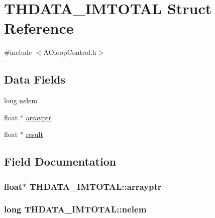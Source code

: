 \hypertarget{structTHDATA__IMTOTAL}{}\section{T\+H\+D\+A\+T\+A\+\_\+\+I\+M\+T\+O\+T\+A\+L Struct Reference}
\label{structTHDATA__IMTOTAL}


{\ttfamily \#include $<$A\+Oloop\+Control.\+h$>$}

\subsection*{Data Fields}
\begin{DoxyCompactItemize}
\item 
long \hyperlink{structTHDATA__IMTOTAL_a76ddea2173c5446db1f3af1494aaf696}{nelem}
\item 
float $\ast$ \hyperlink{structTHDATA__IMTOTAL_ad6cf52b519e71665d6dc23ac14bec80e}{arrayptr}
\item 
float $\ast$ \hyperlink{structTHDATA__IMTOTAL_a9e7c01abf8aad470594aa818ef3335d8}{result}
\end{DoxyCompactItemize}


\subsection{Field Documentation}
\hypertarget{structTHDATA__IMTOTAL_ad6cf52b519e71665d6dc23ac14bec80e}{}
\subsubsection[{arrayptr}]{\setlength{\rightskip}{0pt plus 5cm}float$\ast$ T\+H\+D\+A\+T\+A\+\_\+\+I\+M\+T\+O\+T\+A\+L\+::arrayptr}\label{structTHDATA__IMTOTAL_ad6cf52b519e71665d6dc23ac14bec80e}
\hypertarget{structTHDATA__IMTOTAL_a76ddea2173c5446db1f3af1494aaf696}{}
\subsubsection[{nelem}]{\setlength{\rightskip}{0pt plus 5cm}long T\+H\+D\+A\+T\+A\+\_\+\+I\+M\+T\+O\+T\+A\+L\+::nelem}\label{structTHDATA__IMTOTAL_a76ddea2173c5446db1f3af1494aaf696}
\hypertarget{structTHDATA__IMTOTAL_a9e7c01abf8aad470594aa818ef3335d8}{}
